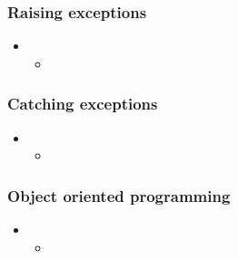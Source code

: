 \begin{frame}[fragile]
%
  \frametitle{Raising exceptions}
%
  \begin{itemize}
%
  \item 
    \begin{itemize}
    \item
    \end{itemize}
%
  \end{itemize}
%
\end{frame}

\begin{frame}[fragile]
%
  \frametitle{Catching exceptions}
%
  \begin{itemize}
%
  \item 
    \begin{itemize}
    \item
    \end{itemize}
%
  \end{itemize}
%
\end{frame}

\begin{frame}[fragile]
%
  \frametitle{Object oriented programming}
%
  \begin{itemize}
%
  \item 
    \begin{itemize}
    \item
    \end{itemize}
%
  \end{itemize}
%
\end{frame}

